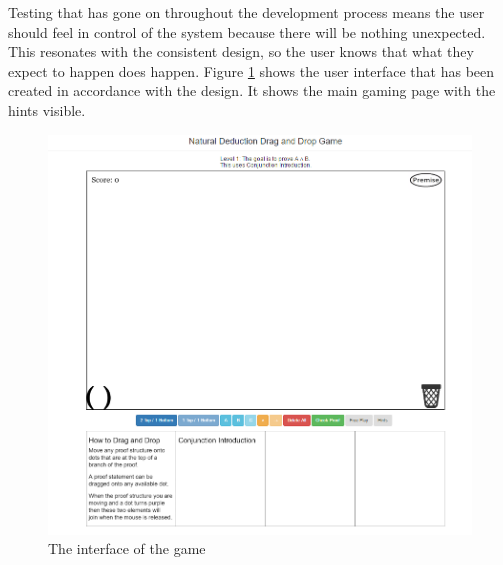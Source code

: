 Testing that has gone on throughout the development process means the user should feel in control of the system because there will be nothing unexpected. This resonates with the consistent design, so the user knows that what they expect to happen does happen. Figure  \ref{fig:game} shows the user interface that has been created in accordance with the design. It shows the main gaming page with the hints visible.

\begin{figure}[H]
\centering
\centerline{\includegraphics[scale=0.65]{game}}
\caption{The interface of the game}
\label{fig:game}
\end{figure}